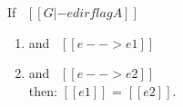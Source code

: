 \begin{comment}
\begin{proof}
By induction on typing relation.
  \begin{itemize}
    \item Cases \rref{typ-int, typ-var, typ-app, typ-sub, typ-abs} are trivial to prove.
    \item Case \rref{typ-anno} requires \cref{lemma:union:value-not-value}.
    \item Case \rref{typ-typeof} requires
    \cref{lemma:union:check-pexpr-ann,lemma:union:check-or-typ,lemma:union:pexpr-inf-typ}.
  \end{itemize}
\end{proof}

\begin{lemma}[Value Decidability]
\label{lemma:union:value-not-value}
$\forall$ $[[e]]$, \ value \ $[[e]]$ \ $\vee$ \ $\neg$ value \ $[[e]]$.
\end{lemma}

\begin{lemma}[check-or-typ]
\label{lemma:union:check-or-typ}
If \ $[[A *s B]]$ \ and \ $[[G |- p <= A \/ B]]$ \ then:
  \begin{enumerate}
    \item either \ $[[G |- p <= A]]$
    \item or \ $[[G |- p <= B]]$
  \end{enumerate}
\end{lemma}

\begin{lemma}[pexpr-inf-typ]
\label{lemma:union:pexpr-inf-typ}
If \ $[[G |- p <= A]]$ \ then:
  \begin{enumerate}
  \item $\exists$ $[[B]]$, \ $[[B <: A]]$
  \item and \ $[[G |- p => B]]$
  \end{enumerate}
\end{lemma}
\end{comment}

\begin{lemma}[Determinism]
\label{lemma:union:determinism}
  If \ $[[G |- e dirflag A]]$
  \begin{enumerate}
  \item and \ $[[e --> e1]]$
  \item and \ $[[e --> e2]]$ \\
  then: $[[e1]]$ = $[[e2]]$.
  \end{enumerate}
\end{lemma}

